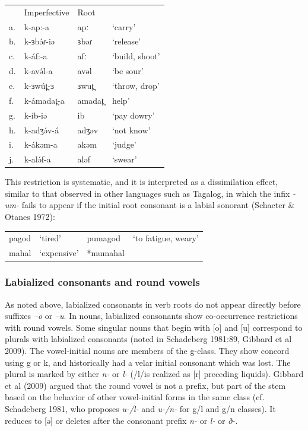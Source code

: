\ea
\begin{tabular}[t]{llll}
&	 	Imperfective	&	Root\\
a.&	k-ap:-a		&	apː		&	‘carry’\\
b.&	k-ɜbə́ɾ-iə	&	ɜbəɾ	&	‘release’\\
c.&	k-áf:-a		&	afː		&	‘build, shoot’\\
d.&	k-avə́l-a		&	avəl		&	‘be sour’\\
e.&	k-ɜwút̪-ɜ	&	ɜwut̪	&	‘throw, drop’\\
f.&	k-ámadat̪-a	&	amadat̪	&	help’\\
g.&	k-íb-iə		&	ib		&	‘pay dowry’\\
h.&	k-adʒə́v-á	&	adʒəv	&	‘not know’\\
i.&	k-ákəm-a	&	akəm		&	‘judge’\\
j.&	k-alə́f-a		&	aləf		&	‘swear’\\
\end{tabular}
\z

This restriction is systematic, and it is interpreted as a dissimilation effect, similar to that observed in other languages such as Tagalog, in which the infix \textit{-um-} fails to appear if the initial root consonant is a labial sonorant (Schacter \& Otanes 1972):

\ea
\begin{tabular}[t]{llll}
pagod &		‘tired’ 	&	pumagod 		&	‘to fatigue, weary’ \\
mahal &		‘expensive’ &	*mumahal \\
\end{tabular}
\z

\subsubsection{Labialized consonants and round vowels}
As noted above, labialized consonants in verb roots do not appear directly before suffixes \textit{–o} or \textit{–u}. In nouns, labialized consonants show co-occurrence restrictions with round vowels. Some singular nouns that begin with [o] and [u] correspond to plurals with labialized consonants (noted in Schadeberg 1981:89, Gibbard et al 2009). The vowel-initial nouns are members of the g-class. They show concord using g or k, and historically had a velar initial consonant which was lost. The plural is marked by either \textit{n-} or \textit{l-} (/l/is realized as [r] preceding liquids). Gibbard et al (2009) argued that the round vowel is not a prefix, but part of the stem based on the behavior of other vowel-initial forms in the same class (cf. Schadeberg 1981, who proposes \textit{u-/l-} and \textit{u-/n-} for g/l and g/n classes). It reduces to [ə] or deletes after the consonant prefix \textit{n-} or \textit{l-} or \textit{ð-}. 

